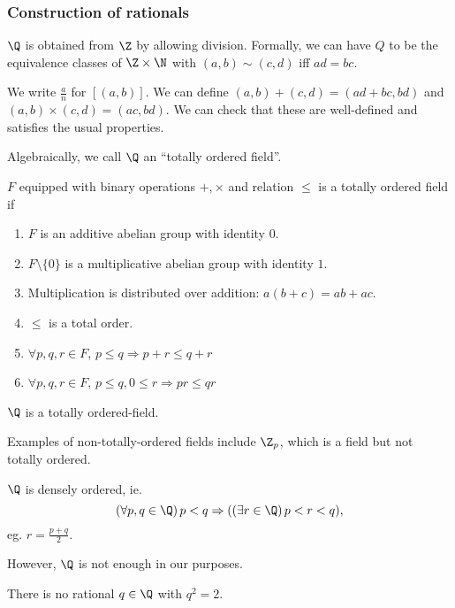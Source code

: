 \documentclass[a4paper]{article}
\begin{document}
\subsubsection*{Construction of rationals}
\begin{defi}[Rationals]
  $\Q$ is obtained from $\Z$ by allowing division. Formally, we can have $Q$ to be the equivalence classes of $\Z \times \N$ with $(a, b) \sim (c, d)$ iff $ad = bc$.

  We write $\frac{a}{n}$ for $[(a, b)]$. We can define $(a, b) + (c, d) = (ad + bc, bd)$ and $(a, b)\times (c, d) = (ac, bd)$. We can check that these are well-defined and satisfies the usual properties.
\end{defi}

Algebraically, we call $\Q$ an ``totally ordered field''.
\begin{defi}
  $F$ equipped with binary operations $+, \times$ and relation $\leq$ is a totally ordered field if
  \begin{enumerate}
    \item $F$ is an additive abelian group with identity $0$.
    \item $F\setminus \{0\}$ is a multiplicative abelian group with identity $1$.
    \item Multiplication is distributed over addition: $a(b + c) = ab + ac$.
    \item $\leq$ is a total order.
    \item $\forall p, q, r\in F$, $p \leq q\Rightarrow p + r \leq q+ r$
    \item $\forall p, q, r\in F$, $p \leq q, 0 \leq r\Rightarrow pr \leq qr$
  \end{enumerate}
\end{defi}

\begin{prop}
  $\Q$ is a totally ordered-field.
\end{prop}

Examples of non-totally-ordered fields include $\Z_p$, which is a field but not totally ordered.
\begin{prop}
  $\Q$ is densely ordered, ie.
  \[
    (\forall p, q\in \Q)\,p < q\Rightarrow ((\exists r \in \Q)\, p < r < q),
  \]
  eg. $r = \frac{p + q}{2}$.
\end{prop}
However, $\Q$ is not enough in our purposes.
\begin{prop}
  There is no rational $q\in \Q$ with $q^2 = 2$.
\end{prop}
\end{document}
